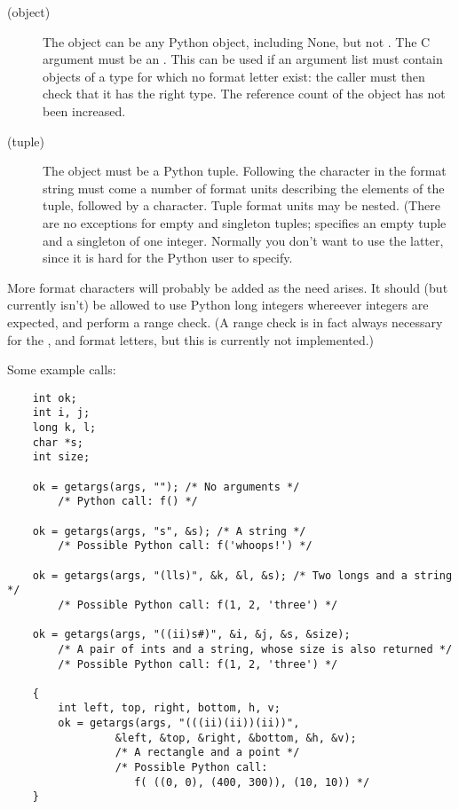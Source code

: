 \begin{description}
\item[ (object)]
The object can be any Python object, including None, but not
.  The C argument must be an .  This can be
used if an argument list must contain objects of a type for which no
format letter exist: the caller must then check that it has the right
type.  The reference count of the object has not been increased.

\item[\samp{(} (tuple)]
The object must be a Python tuple.  Following the \samp{(} character
in the format string must come a number of format units describing the
elements of the tuple, followed by a \samp{)} character.  Tuple
format units may be nested.  (There are no exceptions for empty and
singleton tuples; \samp{()} specifies an empty tuple and  a
singleton of one integer.  Normally you don't want to use the latter,
since it is hard for the Python user to specify.

\end{description}

More format characters will probably be added as the need arises.  It
should (but currently isn't) be allowed to use Python long integers
whereever integers are expected, and perform a range check.  (A range
check is in fact always necessary for the ,  and
 format letters, but this is currently not implemented.)

Some example calls:

\begin{verbatim}
    int ok;
    int i, j;
    long k, l;
    char *s;
    int size;

    ok = getargs(args, ""); /* No arguments */
        /* Python call: f() */
    
    ok = getargs(args, "s", &s); /* A string */
        /* Possible Python call: f('whoops!') */

    ok = getargs(args, "(lls)", &k, &l, &s); /* Two longs and a string */
        /* Possible Python call: f(1, 2, 'three') */
    
    ok = getargs(args, "((ii)s#)", &i, &j, &s, &size);
        /* A pair of ints and a string, whose size is also returned */
        /* Possible Python call: f(1, 2, 'three') */

    {
        int left, top, right, bottom, h, v;
        ok = getargs(args, "(((ii)(ii))(ii))",
                 &left, &top, &right, &bottom, &h, &v);
                 /* A rectangle and a point */
                 /* Possible Python call:
                    f( ((0, 0), (400, 300)), (10, 10)) */
    }
\end{verbatim}

